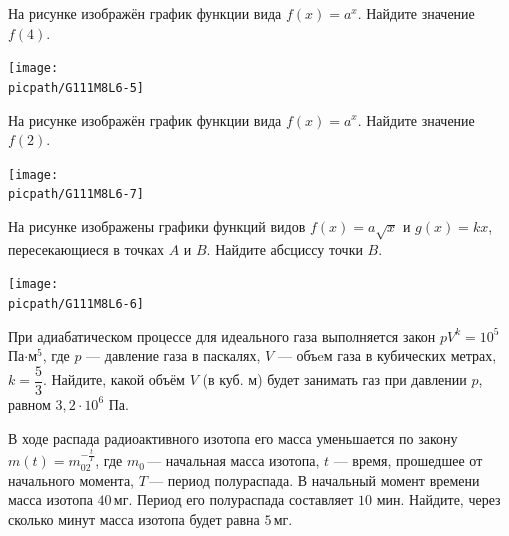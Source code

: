 \begin{class}[number=6]
\begin{listofex}
		\item
		\begin{minipage}[t]{\bodywidth}
			На рисунке изображён график функции вида \(f(x)= a^x\). Найдите значение \(f(4)\).
		\end{minipage}
		\begin{minipage}[t]{\picwidth}
			\texttt{[image: \\picpath/G111M8L6-5]}
		\end{minipage}
		
		\item
		\begin{minipage}[t]{\bodywidth}
			На рисунке изображён график функции вида \(f(x)= a^x\). Найдите значение \(f(2)\).
		\end{minipage}
		\begin{minipage}[t]{\picwidth}
			\texttt{[image: \\picpath/G111M8L6-7]}
		\end{minipage}
		
		\item
		\begin{minipage}[t]{\bodywidth}
			На рисунке изображены графики функций видов \(f(x)= a\sqrt{x} \) и  \(g(x)=kx\), пересекающиеся в точках \(A\) и \(B\). Найдите абсциссу точки \(B\).
		\end{minipage}
		\begin{minipage}[t]{\picwidth}
			\texttt{[image: \\picpath/G111M8L6-6]}
		\end{minipage}
		\item При адиабатическом процессе для идеального газа выполняется закон \(pV^k=10^5\)Па\(\cdot\)м\(^5\), где \(p\) --- давление газа в паскалях, \(V\) --- объeм газа в кубических метрах, \(k=\dfrac{  5}{ 3 }\).  Найдите, какой объём \(V\) (в куб. м) будет занимать газ при давлении \(p\), равном \(3,2\cdot10^6\) Па.
		\item В ходе распада радиоактивного изотопа его масса уменьшается по закону \( m(t)=m_02^{-\tfrac{ t }{ T }} \), где \(m_0\) --- начальная масса изотопа, \(t\) --- время, прошедшее от начального момента, \(T\) --- период полураспада. В начальный момент времени масса изотопа \(40\) мг. Период его полураспада составляет \(10\) мин. Найдите, через сколько минут масса изотопа будет равна \(5\) мг.
	\end{listofex}
\end{class}

